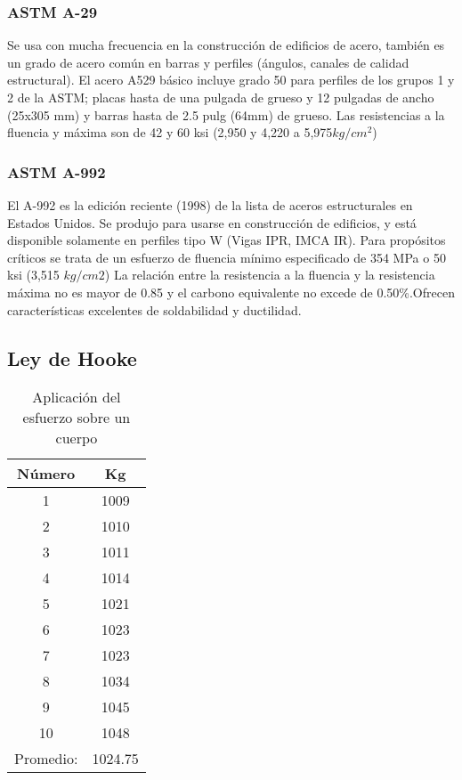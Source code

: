 \subsubsection{ASTM A-29}

Se usa con mucha frecuencia en la construcción de edificios de acero, también es un grado de acero común en barras y perfiles (ángulos, canales de calidad estructural). El acero A529 básico incluye grado 50 para perfiles de los grupos 1 y 2 de la ASTM; placas hasta de una pulgada de grueso y 12 pulgadas de ancho (25x305 mm) y barras hasta de 2.5 pulg (64mm) de grueso. Las resistencias a la fluencia y máxima son de 42 y 60 ksi (2,950 y 4,220 a 5,975$kg/cm^2$)

\subsubsection{ASTM A-992}
El A-992 es la edición reciente (1998) de la lista de aceros estructurales en Estados Unidos. Se produjo para usarse en construcción de edificios, y está disponible solamente en perfiles tipo W (Vigas IPR, IMCA IR). Para propósitos críticos se trata de un esfuerzo de fluencia mínimo especificado de 354 MPa o 50 ksi (3,515 $kg/cm2$) La relación entre la resistencia a la fluencia y la resistencia máxima no es mayor de 0.85 y el carbono equivalente no excede de 0.50\%.Ofrecen características excelentes de soldabilidad y ductilidad.

\subsection{Ley de Hooke}
\begin{table}[h!]
  \centering
    \begin{tabular}{@{}cc@{}}
    \toprule
    Número & Kg      \\ \midrule
    1      & 1009    \\
    2      & 1010    \\
    3      & 1011    \\
    4      & 1014    \\
    5      & 1021    \\
    6      & 1023    \\
    7      & 1023    \\
    8      & 1034    \\
    9      & 1045    \\
    10     & 1048    \\
    Promedio:  & 1024.75 \\ \bottomrule
    \end{tabular}
    \caption{Aplicación del esfuerzo sobre un cuerpo}
    \label{tabmm1}
\end{table}

